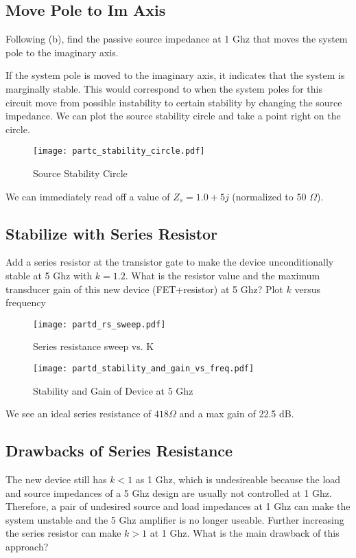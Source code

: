 \subsection{Move Pole to Im Axis}
{\color{blue} Following (b), find the passive source impedance at 1 Ghz that moves the system pole to the imaginary axis.}

If the system pole is moved to the imaginary axis, it indicates that the system is marginally stable.
This would correspond to when the system poles for this circuit move from possible instability to certain stability by changing the source impedance.
We can plot the source stability circle and take a point right on the circle.
\begin{figure}[H]
    \centering \texttt{[image: partc\_stability\_circle.pdf]}
    \caption{Source Stability Circle}
\end{figure}
We can immediately read off a value of $Z_s = 1.0 + 5j$ (normalized to 50 $\Omega$).

\subsection{Stabilize with Series Resistor}
{\color{blue} Add a series resistor at the transistor gate to make the device unconditionally stable at 5 Ghz with $k=1.2$.
What is the resistor value and the maximum transducer gain of this new device (FET+resistor) at 5 Ghz?
Plot $k$ versus frequency}

\begin{figure}[H]
    \texttt{[image: partd\_rs\_sweep.pdf]}
    \caption{Series resistance sweep vs. K}
    \endminipage\hfill
    \texttt{[image: partd\_stability\_and\_gain\_vs\_freq.pdf]}
    \caption{Stability and Gain of Device at 5 Ghz}
    \endminipage
\end{figure}

We see an ideal series resistance of $418 \Omega$ and a max gain of 22.5 dB.

\subsection{Drawbacks of Series Resistance}
{\color{blue} The new device still has $k < 1$ as 1 Ghz, which is undesireable because the load and source impedances of a 5 Ghz design are usually not controlled at 1 Ghz.
Therefore, a pair of undesired source and load impedances at 1 Ghz can make the system unstable and the 5 Ghz amplifier is no longer useable.
Further increasing the series resistor can make $k > 1$ at 1 Ghz.
What is the main drawback of this approach?}

